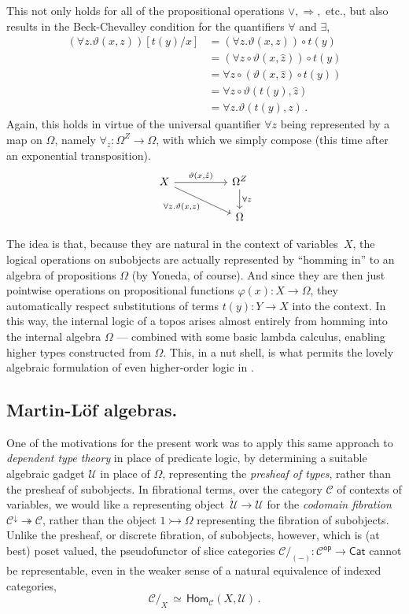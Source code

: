 \documentclass[12pt,reqno]{amsart}
\newcommand{\CC}{\ensuremath{\mathcal{C}}}
\newcommand{\op}[1]{\ensuremath{{#1}^{\mathsf{op}}}}
\newcommand{\Hom}{\ensuremath{\mathsf{Hom}}}
\newcommand{\mono}{\ensuremath{\rightarrowtail}}
\renewcommand{\epi}{\ensuremath{\twoheadrightarrow}}
\renewcommand{\to}{\ensuremath{\rightarrow}}
\newcommand{\U}{\ensuremath{\mathcal{U}}}
\newcommand{\UU}{\ensuremath{\,\dot{\mathcal{U}}}}
\theoremstyle{remark}
\theoremstyle{definition}
\begin{document}
This not only holds for all of the propositional operations $\vee, \Rightarrow,$ etc., but also results in the Beck-Chevalley condition for the quantifiers $\forall$ and $\exists$, 
\begin{align*}
(\forall z .\vartheta(x,z))[t(y)/x] &= (\forall z .\vartheta(x,z))\circ t(y) \\
&= (\forall z \circ \vartheta(x,\hat{z}))\circ t(y)\\
&= \forall z \circ (\vartheta(x,\hat{z})\circ t(y))\\
&= \forall z \circ \vartheta(t(y),\hat{z})\\
&= \forall z .\vartheta(t(y),z)\,.
\end{align*}
Again, this holds in virtue of the universal quantifier $\forall z$ being represented by a map on $\Omega$, namely $\forall_z : \Omega^{Z} \to \Omega$, with which we simply compose (this time after an exponential transposition).
\begin{equation}\label{diag:BCforQ}
\begin{tikzcd}
 X \ar[rr, "{\vartheta(x,\hat{z})}" ] \ar[rrd,swap,  "{\forall z. \vartheta(x,z)}"] && \Omega^{Z} \ar[d, "{\forall z}"] \\
 && \Omega
\end{tikzcd}
\end{equation}

The idea is that, because they are natural in the context of variables~$X$, the logical operations on subobjects are actually represented by ``homming in'' to an algebra of propositions $\Omega$ (by Yoneda, of course). And since they are then just pointwise operations on propositional functions $\varphi(x) : X \to \Omega$, they automatically respect substitutions of terms $t(y): Y \to X$  into the context.  In this way,  the internal logic of a topos arises almost entirely from homming into the internal algebra $\Omega$ --- combined with some basic lambda calculus, enabling higher types constructed from $\Omega$.  This, in a nut shell, is what permits the lovely algebraic formulation of even higher-order logic in \cite{LS:1988}.  

\subsection*{Martin-L\"of algebras.} One of the motivations for the present work was to apply this same approach to \emph{dependent type theory} in place of predicate logic, by determining a suitable algebraic gadget $\U$ in place of $\Omega$, representing the \emph{presheaf of types}, rather than the presheaf of subobjects.  In fibrational terms, over the category $\CC$ of contexts of variables, we would like a representing object $\UU \to \U$ for the \emph{codomain fibration} $\CC^\downarrow \epi \CC$, rather than the object $1\mono \Omega$ representing the fibration of subobjects.  Unlike the presheaf, or discrete fibration, of subobjects, however, which is (at best) poset valued, the pseudofunctor of slice categories $\CC/_{\!(-)} : \op{\CC} \to \mathsf{Cat}$ cannot be representable, even in the weaker sense of a natural equivalence of indexed categories,
\[
\CC/_{X}\, \simeq\, \Hom_{\CC}(X, \U)\,.
\]
\end{document}
